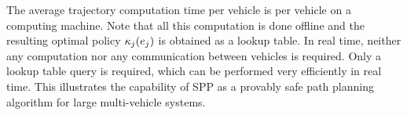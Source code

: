 The average trajectory computation time per vehicle is  per vehicle on a  computing machine. Note that all this computation is done offline and the resulting optimal policy $\kappa_j(e_j)$ is obtained as a lookup table. In real time, neither any computation nor any communication between vehicles is required. Only a lookup table query is required, which can be performed very efficiently in real time. This illustrates the capability of SPP as a provably safe path planning algorithm for large multi-vehicle systems.